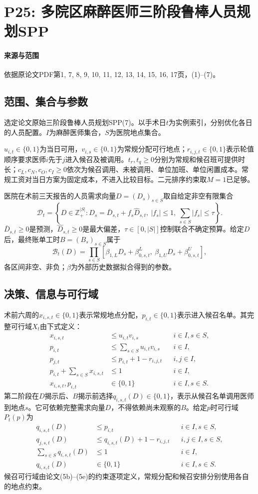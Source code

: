 \documentclass[UTF8,11pt]{ctexart}
\begin{document}
\section*{P25: 多院区麻醉医师三阶段鲁棒人员规划SPP}
\paragraph{来源与范围}依据原论文PDF第1, 7, 8, 9, 10, 11, 12, 13, 14, 15, 16, 17页，(1)–(7)。
\subsection*{范围、集合与参数}
选定论文原始三阶段鲁棒人员规划SPP(7)。以手术日$t$为实例索引，分别优化各日的人员配置。$I$为麻醉医师集合，$S$为医院地点集合。

$u_{i,t}\in\{0,1\}$为当日可用，$v_{i,s}\in\{0,1\}$为常规分配可行地点；$r_{i,j,t}\in\{0,1\}$表示轮值顺序要求医师$i$先于$j$进入候召及被调用。$t_r,t_q\geq0$分别为常规和候召班可提供时长；$c_L,c_N,c_O,c_I\geq0$依次为候召调用、未被调用、单位加班、单位闲置成本。常规工资对当日方案为固定成本，不进入比较目标。二元排序约束取$M=1$已足够。

医院在术前三天报告的人员需求向量$D=(D_s)_{s\in S}$取自给定非空有限集合
\[
\mathcal D_t=\left\{D\in\mathbb Z_+^{|S|}:D_s=\bar D_{s,t}+f_s\widehat D_{s,t},\ |f_s|\leq1,\ \sum_{s\in S}|f_s|\leq\tau\right\}.
\]
$\bar D_{s,t}\geq0$是预测，$\widehat D_{s,t}\geq0$是最大偏差，$\tau\in[0,|S|]$控制联合不确定预算。给定$D$后，最终账单工时$B=(B_s)_{s\in S}$属于
\[
\mathcal B_t(D)=\prod_{s\in S}[\beta_{1,L}D_s+\beta_{0,s,t}^{L},\ \beta_{1,U}D_s+\beta_{0,s,t}^{U}],
\]
各区间非空、非负；$\beta$为外部历史数据拟合得到的参数。
\subsection*{决策、信息与可行域}
术前六周的$x_{i,s,t}\in\{0,1\}$表示常规地点分配，$p_{i,t}\in\{0,1\}$表示进入候召名单。其完整可行域$X_t$由下式定义：
\begin{align}
x_{i,s,t}&\leq u_{i,t}v_{i,s}&&i\in I,s\in S,\\
p_{i,t}&\leq\sum_{s\in S}u_{i,t}v_{i,s}&&i\in I,\\
p_{j,t}&\leq p_{i,t}+1-r_{i,j,t}&&i,j\in I,\\
p_{i,t}+\sum_{s\in S}x_{i,s,t}&\leq1&&i\in I,\\
x_{i,s,t},p_{i,t}&\in\{0,1\}&&i\in I,s\in S.
\end{align}
第二阶段在$D$揭示后、$B$揭示前选择$q_{i,s,t}(D)\in\{0,1\}$，表示从候召名单调用医师到地点$s$。它可依赖完整需求向量$D$，不得依赖尚未观察的$B$。给定$p$时可行域$P_t(p)$为
\begin{align}
q_{i,s,t}(D)&\leq p_{i,t}&&i\in I,s\in S,\\
q_{j,s,t}(D)&\leq q_{i,s,t}(D)+1-r_{i,j,t}&&i,j\in I,s\in S,\\
\sum_{s\in S}q_{i,s,t}(D)&\leq1&&i\in I,\\
q_{i,s,t}(D)&\in\{0,1\}&&i\in I,s\in S.
\end{align}
候召可行域由论文(5b)--(5e)的约束逐项定义，常规分配和候召安排分别使用各自的地点约束。
\end{document}
